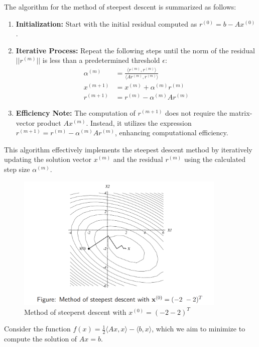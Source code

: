 \documentclass[unicode,11pt,a4paper,oneside,numbers=endperiod,openany]{scrartcl}
\begin{document}
The algorithm for the method of steepest descent is summarized as follows:

\begin{enumerate}
    \item \textbf{Initialization:} Start with the initial residual computed as \( r^{(0)} = b - Ax^{(0)} \).

    \item \textbf{Iterative Process:} Repeat the following steps until the norm of the residual \( ||r^{(m)}|| \) is less than a predetermined threshold \( \epsilon \):
    \begin{align*}
        \alpha^{(m)} &= \frac{\langle r^{(m)}, r^{(m)} \rangle}{\langle Ar^{(m)}, r^{(m)} \rangle} \\
        x^{(m+1)} &= x^{(m)} + \alpha^{(m)} r^{(m)} \\
        r^{(m+1)} &= r^{(m)} - \alpha^{(m)} Ar^{(m)}
    \end{align*}

    \item \textbf{Efficiency Note:} The computation of \( r^{(m+1)} \) does not require the matrix-vector product \( Ax^{(m)} \). Instead, it utilizes the expression \( r^{(m+1)} = r^{(m)} - \alpha^{(m)} Ar^{(m)} \), enhancing computational efficiency.
\end{enumerate}

This algorithm effectively implements the steepest descent method by iteratively updating the solution vector \( x^{(m)} \) and the residual \( r^{(m)} \) using the calculated step size \( \alpha^{(m)} \).
\begin{figure}[H]
    \centering
    \includegraphics[trim=0cm 5cm 0cm 0cm, clip, width=10cm]{img6.png}
    \caption{Method of steeperst descent with $x^{(0)}=(-2 -2)^T$}
    \label{fig:img6}
\end{figure}
Consider the function \( f(x) = \frac{1}{2} \langle Ax, x \rangle - \langle b, x \rangle \), which we aim to minimize to compute the solution of \( Ax = b \).
\end{document}
